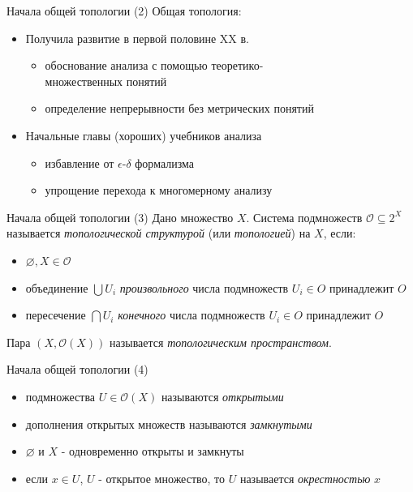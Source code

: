 \documentclass{beamer}
\begin{document}
\begin{frame}{Начала общей топологии (2)}
Общая топология:\\
\bigskip
\begin{itemize}
	\item Получила развитие в первой половине XX в.
		\begin{itemize}
			\item обоснование анализа с помощью теоретико-\\множественных понятий
			\item определение непрерывности без метрических понятий
		\end{itemize}
	\bigskip
	\item Начальные главы (хороших) учебников анализа
		\begin{itemize}
			\item избавление от $\epsilon$-$\delta$ формализма
			\item упрощение перехода к многомерному анализу
		\end{itemize}
\end{itemize}
\end{frame}


\begin{frame}{Начала общей топологии (3)}
Дано множество $X$. Система подмножеств $\mathcal{O} \subseteq 2^X$ называется \textit{топологической структурой} (или \textit{топологией}) на $X$, если:\\
\bigskip
\begin{itemize}
	\item $\varnothing, X \in \mathcal{O}$
	\item объединение $\bigcup U_i$ \textit{произвольного} числа подмножеств $U_i \in O$ принадлежит $O$
	\item пересечение $\bigcap U_i$ \textit{конечного} числа подмножеств $U_i \in O$ принадлежит $O$
\end{itemize}
\bigskip
Пара $(X, \mathcal{O}(X))$ называется \textit{топологическим пространством}.
\end{frame}

\begin{frame}{Начала общей топологии (4)}
\begin{itemize}
	\item подмножества $U \in \mathcal{O}(X)$ называются \textit{открытыми}
	\item дополнения открытых множеств называются \textit{замкнутыми}
	\item $\varnothing$ и $X$ - одновременно открыты и замкнуты
	\item если $x \in U$, $U$ - открытое множество, то $U$ называется \textit{окрестностью} $x$
\end{itemize}
\end{frame}
\end{document}
